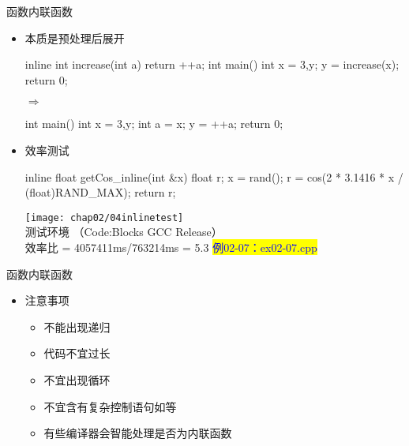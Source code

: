 \begin{frame}[fragile]{函数}{内联函数}
  \begin{itemize}
  \item 本质是预处理后展开\\
    \begin{center}
      \begin{minipage}{0.4\linewidth}
        \begin{cppcode}
inline int increase(int a)
{
  return ++a;
}
int main()
{
  int x = 3,y;
  y = increase(x);
  return 0;
}
        \end{cppcode}
      \end{minipage}$\Longrightarrow$
      \begin{minipage}{0.3\linewidth}
        \begin{cppcode}
int main()
{
  int x = 3,y;
  int a = x;
  y = ++a;
  return 0;
}
        \end{cppcode}
      \end{minipage}
    \end{center}
  \item 效率测试\\
    \begin{center}
      \begin{minipage}{0.56\linewidth}
        \begin{cppcode}
inline float getCos_inline(int &x)
{
  float r;
  x = rand();
  r = cos(2 * 3.1416 * x / (float)RAND_MAX);
  return r;
}
        \end{cppcode}
      \end{minipage}
      \begin{minipage}{0.4\linewidth}
        \texttt{[image: chap02/04inlinetest]}\\
        \tiny
        测试环境 （Code:Blocks GCC Release）\\
        效率比 = 4057411ms/763214ms = 5.3
        \colorbox{yellow}{\textcolor{blue}{例02-07：ex02-07.cpp}}
      \end{minipage}
    \end{center}
  \end{itemize}
\end{frame}

\begin{frame}[fragile]{函数}{内联函数}
  \stretchon
  \begin{itemize}
  \item 注意事项
    \begin{itemize}
    \item 不能出现递归
    \item 代码不宜过长
    \item 不宜出现循环
    \item 不宜含有复杂控制语句如等
    \item 有些编译器会智能处理是否为内联函数
    \end{itemize}
  \end{itemize}
  \stretchoff
\end{frame}
